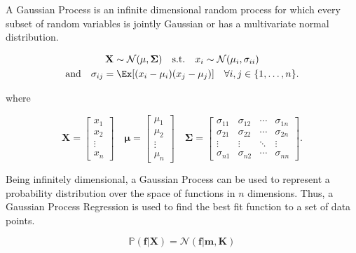 \documentclass[\econtexRoot/SequentialEGM]{subfiles}
\begin{document}
A Gaussian Process is an infinite dimensional random process for which every subset of random variables is jointly Gaussian or has a multivariate normal distribution.

\begin{equation}
    \begin{gathered}
        \mathbf{X} \sim \mathcal{N}(\mathbf{\mu}, \mathbf{\Sigma}) \quad \text{s.t.} \quad x_i \sim \mathcal{N}(\mu_i, \sigma_{ii}) \\
        \text{and} \quad  \sigma_{ij} = \Ex[(x_i - \mu_i)(x_j - \mu_j)] \quad \forall i,j \in \{1, \ldots, n\}.
    \end{gathered}
\end{equation}


where

\begin{equation}
    \mathbf{X} = \begin{bmatrix}
        x_1    \\
        x_2    \\
        \vdots \\
        x_n
    \end{bmatrix}
    \quad
    \mathbf{\mu} = \begin{bmatrix}
        \mu_1  \\
        \mu_2  \\
        \vdots \\
        \mu_n
    \end{bmatrix}
    \quad
    \mathbf{\Sigma} = \begin{bmatrix}
        \sigma_{11} & \sigma_{12} & \cdots & \sigma_{1n} \\
        \sigma_{21} & \sigma_{22} & \cdots & \sigma_{2n} \\
        \vdots      & \vdots      & \ddots & \vdots      \\
        \sigma_{n1} & \sigma_{n2} & \cdots & \sigma_{nn}
    \end{bmatrix}.
\end{equation}

Being infinitely dimensional, a Gaussian Process can be used to represent a probability distribution over the space of functions in $n$ dimensions. Thus, a Gaussian Process Regression is used to find the best fit function to a set of data points.

\begin{equation}
    \mathbb{P}(\mathbf{f} | \mathbf{X}) = \mathcal{N}(\mathbf{f} | \mathbf{m}, \mathbf{K})
\end{equation}
\end{document}
